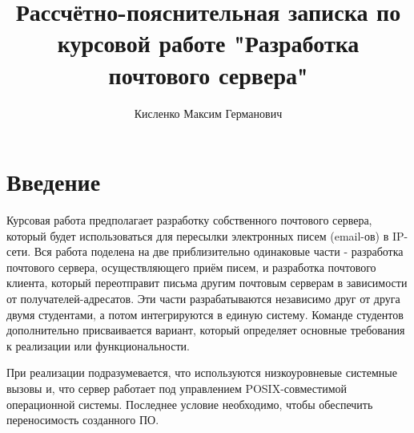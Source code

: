 \documentclass[a4paper,12pt]{report}
\title{Рассчётно-пояснительная записка по курсовой работе "Разработка почтового сервера"}
\author{Кисленко Максим Германович}
\begin{document}
\maketitle

\tableofcontents

\cleardoublepage
{}
{}
\chapter*{Введение}



Курсовая работа предполагает разработку собственного почтового сервера, который будет использоваться для пересылки электронных писем (email-ов) в IP-сети. Вся работа поделена на две приблизительно одинаковые части - разработка почтового сервера, осуществляющего приём писем, и разработка почтового клиента, который переотправит письма другим почтовым серверам в зависимости от получателей-адресатов. Эти части разрабатываются независимо друг от друга двумя студентами, а потом интегрируются в единую систему. Команде студентов дополнительно присваивается вариант, который определяет основные требования к реализации или функциональности.

При реализации подразумевается, что используются низкоуровневые системные вызовы и, что сервер работает под управлением POSIX-совместимой операционной системы. Последнее условие необходимо, чтобы обеспечить переносимость созданного ПО.
\end{document}
